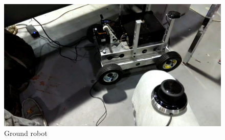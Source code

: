 \documentclass{article}
\begin{document}
\begin{figure}[!htbp]
\centering
\includegraphics[width=4.5in]{ground_robot.png}
\caption{Ground robot}
\label{fig:ground_robot}
\end{figure}
\end{document}
